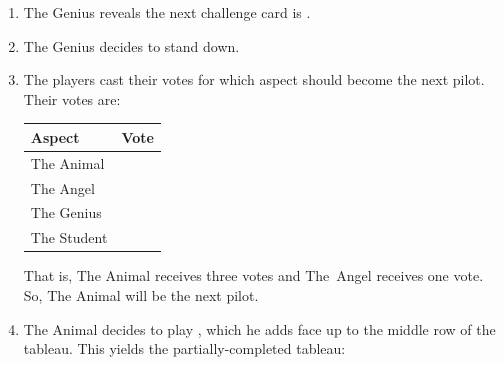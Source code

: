 \documentclass[a4paper, 10pt,notumble]{leaflet}
\DeclareRobustCommand\spades[1][black]{\textcolor{#1}{\cardfont{\}}}}
\DeclareRobustCommand\hearts[1][red]{\textcolor{#1}{{\cardfont{\{}}}}
\DeclareRobustCommand\diamonds[1][red]{\textcolor{#1}{{\cardfont{[}}}}
\DeclareRobustCommand\clubs[1][black]{\textcolor{#1}{\cardfont{]}}}
\DeclareRobustCommand\four[1][black]{\textcolor{#1}{\cardfont{4}}}
\DeclareRobustCommand\five[1][black]{\textcolor{#1}{\cardfont{5}}}
\DeclareRobustCommand\jack[1][black]{\textcolor{#1}{\cardfont{J}}}
\DeclareRobustCommand\queen[1][black]{\textcolor{#1}{\cardfont{Q}}}
\begin{document}
\begin{enumerate}
	\item The Genius reveals the next challenge card is \four[red]\hearts.
	\item The Genius decides to stand down.
	\item The players cast their votes for which aspect should become the next pilot. Their votes are:
	\begin{table}[h]
	\centering
	\begin{tabular}{l r}
	\toprule
	Aspect & Vote \\ \midrule
	The Animal & \jack\clubs \\
	The Angel  & \queen[red]\hearts \\
	The Genius & \jack\spades \\
	The Student & \jack[red]\diamonds \\ \bottomrule
	\end{tabular}
	\end{table}
%	
%
	
	That is, The Animal receives three votes and The~Angel receives one vote. So, The Animal will be the next pilot.
	\item The Animal decides to play \five\clubs, which he adds face up to the middle row of the tableau. This yields the partially-completed tableau:
	

\end{enumerate}
\end{document}
